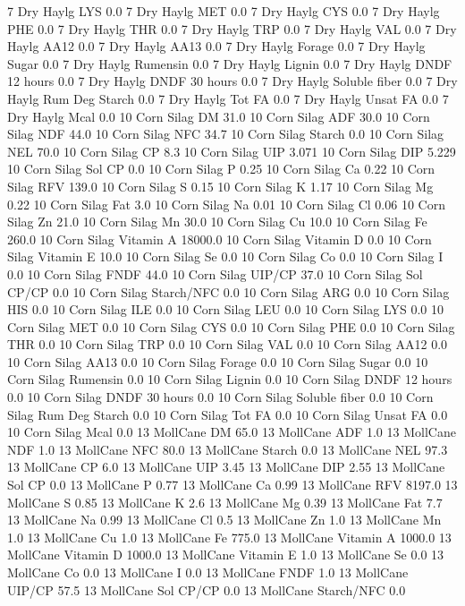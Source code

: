 \documentclass[letterpaper,10pt,english]{sphinxmanual}
\begin{document}
\begin{sphinxVerbatim}[commandchars=\\\{\},numbers=left,firstnumber=1,stepnumber=1]
7 Dry Haylg LYS 0.0
7 Dry Haylg MET 0.0
7 Dry Haylg CYS 0.0
7 Dry Haylg PHE 0.0
7 Dry Haylg THR 0.0
7 Dry Haylg TRP 0.0
7 Dry Haylg VAL 0.0
7 Dry Haylg AA\PYGZsh{}12 0.0
7 Dry Haylg AA\PYGZsh{}13 0.0
7 Dry Haylg \PYGZpc{} Forage 0.0
7 Dry Haylg Sugar \PYGZpc{} 0.0
7 Dry Haylg Rumensin 0.0
7 Dry Haylg Lignin 0.0
7 Dry Haylg DNDF 12 hours 0.0
7 Dry Haylg DNDF 30 hours 0.0
7 Dry Haylg Soluble fiber 0.0
7 Dry Haylg Rum Deg Starch 0.0
7 Dry Haylg Tot FA 0.0
7 Dry Haylg Unsat FA 0.0
7 Dry Haylg Mcal 0.0
10 Corn Silag DM 31.0
10 Corn Silag ADF 30.0
10 Corn Silag NDF 44.0
10 Corn Silag NFC 34.7
10 Corn Silag Starch 0.0
10 Corn Silag NEL 70.0
10 Corn Silag CP 8.3
10 Corn Silag UIP 3.071
10 Corn Silag DIP 5.229
10 Corn Silag Sol CP 0.0
10 Corn Silag P 0.25
10 Corn Silag Ca 0.22
10 Corn Silag RFV 139.0
10 Corn Silag S 0.15
10 Corn Silag K 1.17
10 Corn Silag Mg 0.22
10 Corn Silag Fat 3.0
10 Corn Silag Na 0.01
10 Corn Silag Cl 0.06
10 Corn Silag Zn 21.0
10 Corn Silag Mn 30.0
10 Corn Silag Cu 10.0
10 Corn Silag Fe 260.0
10 Corn Silag Vitamin A 18000.0
10 Corn Silag Vitamin D 0.0
10 Corn Silag Vitamin E 10.0
10 Corn Silag Se 0.0
10 Corn Silag Co 0.0
10 Corn Silag I 0.0
10 Corn Silag FNDF 44.0
10 Corn Silag UIP/CP 37.0
10 Corn Silag Sol CP/CP 0.0
10 Corn Silag Starch/NFC 0.0
10 Corn Silag ARG 0.0
10 Corn Silag HIS 0.0
10 Corn Silag ILE 0.0
10 Corn Silag LEU 0.0
10 Corn Silag LYS 0.0
10 Corn Silag MET 0.0
10 Corn Silag CYS 0.0
10 Corn Silag PHE 0.0
10 Corn Silag THR 0.0
10 Corn Silag TRP 0.0
10 Corn Silag VAL 0.0
10 Corn Silag AA\PYGZsh{}12 0.0
10 Corn Silag AA\PYGZsh{}13 0.0
10 Corn Silag \PYGZpc{} Forage 0.0
10 Corn Silag Sugar \PYGZpc{} 0.0
10 Corn Silag Rumensin 0.0
10 Corn Silag Lignin 0.0
10 Corn Silag DNDF 12 hours 0.0
10 Corn Silag DNDF 30 hours 0.0
10 Corn Silag Soluble fiber 0.0
10 Corn Silag Rum Deg Starch 0.0
10 Corn Silag Tot FA 0.0
10 Corn Silag Unsat FA 0.0
10 Corn Silag Mcal 0.0
13 MollCane DM 65.0
13 MollCane ADF 1.0
13 MollCane NDF 1.0
13 MollCane NFC 80.0
13 MollCane Starch 0.0
13 MollCane NEL 97.3
13 MollCane CP 6.0
13 MollCane UIP 3.45
13 MollCane DIP 2.55
13 MollCane Sol CP 0.0
13 MollCane P 0.77
13 MollCane Ca 0.99
13 MollCane RFV 8197.0
13 MollCane S 0.85
13 MollCane K 2.6
13 MollCane Mg 0.39
13 MollCane Fat 7.7
13 MollCane Na 0.99
13 MollCane Cl 0.5
13 MollCane Zn 1.0
13 MollCane Mn 1.0
13 MollCane Cu 1.0
13 MollCane Fe 775.0
13 MollCane Vitamin A 1000.0
13 MollCane Vitamin D 1000.0
13 MollCane Vitamin E 1.0
13 MollCane Se 0.0
13 MollCane Co 0.0
13 MollCane I 0.0
13 MollCane FNDF 1.0
13 MollCane UIP/CP 57.5
13 MollCane Sol CP/CP 0.0
13 MollCane Starch/NFC 0.0

\end{sphinxVerbatim}
\end{document}
